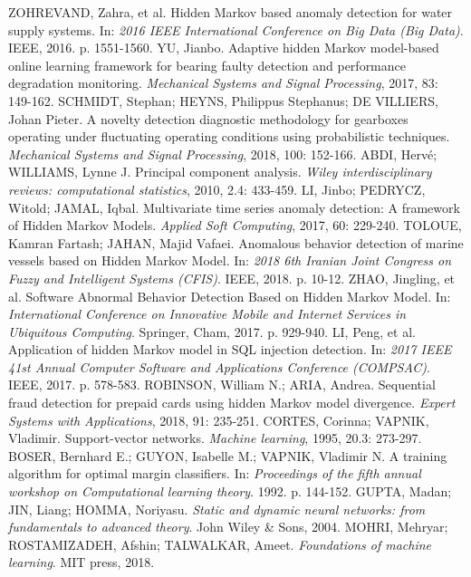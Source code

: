 \documentclass[11pt,twoside,openright]{report}
\begin{document}
\begin{thebibliography}{L}
ZOHREVAND, Zahra, et al. Hidden Markov based anomaly detection for water supply systems. In: \textit{2016 IEEE International Conference on Big Data (Big Data)}. IEEE, 2016. p. 1551-1560.
YU, Jianbo. Adaptive hidden Markov model-based online learning framework for bearing faulty detection and performance degradation monitoring. \textit{Mechanical Systems and Signal Processing}, 2017, 83: 149-162.
SCHMIDT, Stephan; HEYNS, Philippus Stephanus; DE VILLIERS, Johan Pieter. A novelty detection diagnostic methodology for gearboxes operating under fluctuating operating conditions using probabilistic techniques. \textit{Mechanical Systems and Signal Processing}, 2018, 100: 152-166.
ABDI, Hervé; WILLIAMS, Lynne J. Principal component analysis. \textit{Wiley interdisciplinary reviews: computational statistics}, 2010, 2.4: 433-459.
LI, Jinbo; PEDRYCZ, Witold; JAMAL, Iqbal. Multivariate time series anomaly detection: A framework of Hidden Markov Models. \textit{Applied Soft Computing}, 2017, 60: 229-240.
TOLOUE, Kamran Fartash; JAHAN, Majid Vafaei. Anomalous behavior detection of marine vessels based on Hidden Markov Model. In: \textit{2018 6th Iranian Joint Congress on Fuzzy and Intelligent Systems (CFIS)}. IEEE, 2018. p. 10-12.
ZHAO, Jingling, et al. Software Abnormal Behavior Detection Based on Hidden Markov Model. In: \textit{International Conference on Innovative Mobile and Internet Services in Ubiquitous Computing}. Springer, Cham, 2017. p. 929-940.
LI, Peng, et al. Application of hidden Markov model in SQL injection detection. In: \textit{2017 IEEE 41st Annual Computer Software and Applications Conference (COMPSAC)}. IEEE, 2017. p. 578-583.
ROBINSON, William N.; ARIA, Andrea. Sequential fraud detection for prepaid cards using hidden Markov model divergence. \textit{Expert Systems with Applications}, 2018, 91: 235-251.
CORTES, Corinna; VAPNIK, Vladimir. Support-vector networks. \textit{Machine learning}, 1995, 20.3: 273-297.
BOSER, Bernhard E.; GUYON, Isabelle M.; VAPNIK, Vladimir N. A training algorithm for optimal margin classifiers. In: \textit{Proceedings of the fifth annual workshop on Computational learning theory}. 1992. p. 144-152.
GUPTA, Madan; JIN, Liang; HOMMA, Noriyasu. \textit{Static and dynamic neural networks: from fundamentals to advanced theory}. John Wiley \& Sons, 2004.
MOHRI, Mehryar; ROSTAMIZADEH, Afshin; TALWALKAR, Ameet. \textit{Foundations of machine learning}. MIT press, 2018.

\end{thebibliography}
\end{document}
